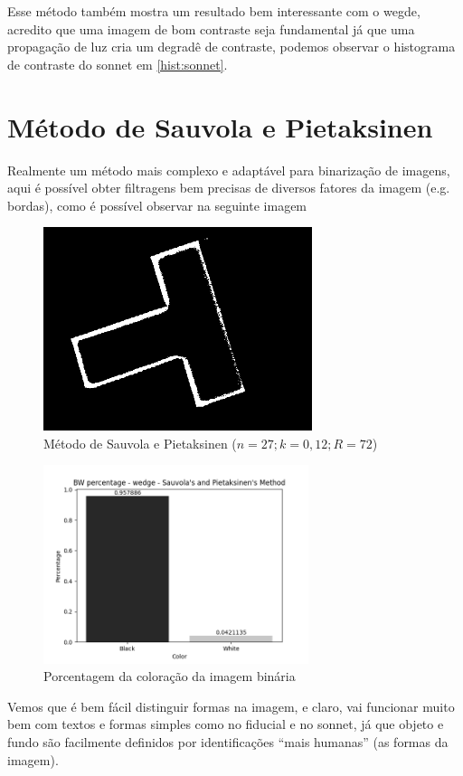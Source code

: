 \documentclass[12pt, letterpaper]{article}
\begin{document}
    Esse método também mostra um resultado bem interessante com o wegde, acredito que uma imagem de bom contraste seja fundamental já que uma propagação de luz cria um degradê de contraste, podemos observar o histograma de contraste do sonnet em \ref{hist:sonnet}.

\section{Método de Sauvola e Pietaksinen}
    Realmente um método mais complexo e adaptável para binarização de imagens, aqui é possível obter filtragens bem precisas de diversos fatores da imagem (e.g. bordas), como é possível observar na seguinte imagem
    \begin{figure}[H]
        \centering
        \includegraphics[width=0.7\textwidth]{sauvola_wedge.png}
        \\{Método de Sauvola e Pietaksinen ($n = 27; k = 0,12; R = 72$)}

        \includegraphics[width=0.69\textwidth]{sauvola_wedge_bw_percentage.png}
        \\{Porcentagem da coloração da imagem binária}
    \end{figure}
    Vemos que é bem fácil distinguir formas na imagem, e claro, vai funcionar muito bem com textos e formas simples como no fiducial e no sonnet, já que objeto e fundo são facilmente definidos por identificações ``mais humanas'' (as formas da imagem).
\end{document}
